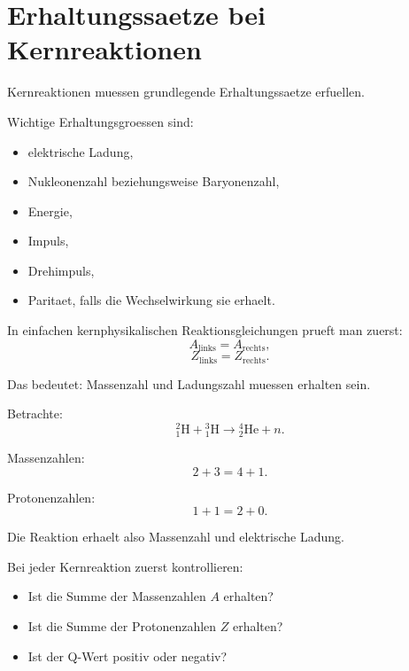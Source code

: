 \section{Erhaltungssaetze bei Kernreaktionen}

Kernreaktionen muessen grundlegende Erhaltungssaetze erfuellen.

\begin{notebox}
Wichtige Erhaltungsgroessen sind:
\begin{itemize}
    \item elektrische Ladung,
    \item Nukleonenzahl beziehungsweise Baryonenzahl,
    \item Energie,
    \item Impuls,
    \item Drehimpuls,
    \item Paritaet, falls die Wechselwirkung sie erhaelt.
\end{itemize}
\end{notebox}

\begin{conceptbox}
In einfachen kernphysikalischen Reaktionsgleichungen prueft man zuerst:
\[
    A_{\mathrm{links}} = A_{\mathrm{rechts}},
\]
\[
    Z_{\mathrm{links}} = Z_{\mathrm{rechts}}.
\]

Das bedeutet:
Massenzahl und Ladungszahl muessen erhalten sein.
\end{conceptbox}

\begin{examplebox}
Betrachte:
\[
    {}^{2}_{1}\mathrm{H}
    +
    {}^{3}_{1}\mathrm{H}
    \rightarrow
    {}^{4}_{2}\mathrm{He}
    +
    n.
\]

Massenzahlen:
\[
    2+3 = 4+1.
\]

Protonenzahlen:
\[
    1+1 = 2+0.
\]

Die Reaktion erhaelt also Massenzahl und elektrische Ladung.
\end{examplebox}

\begin{examtipbox}
Bei jeder Kernreaktion zuerst kontrollieren:
\begin{itemize}
    \item Ist die Summe der Massenzahlen $A$ erhalten?
    \item Ist die Summe der Protonenzahlen $Z$ erhalten?
    \item Ist der Q-Wert positiv oder negativ?
\end{itemize}
\end{examtipbox}

